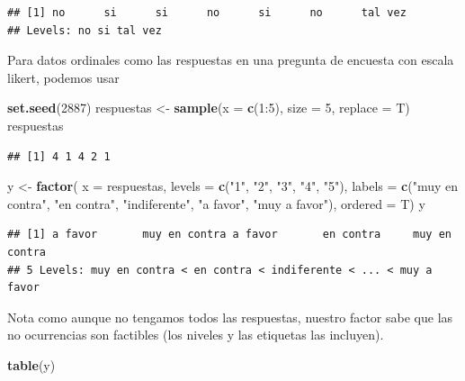 \documentclass[]{article}
\newenvironment{Shaded}{\begin{snugshade}}{\end{snugshade}}
\newcommand{\KeywordTok}[1]{\textcolor[rgb]{0.13,0.29,0.53}{\textbf{{#1}}}}
\newcommand{\DataTypeTok}[1]{\textcolor[rgb]{0.13,0.29,0.53}{{#1}}}
\newcommand{\DecValTok}[1]{\textcolor[rgb]{0.00,0.00,0.81}{{#1}}}
\newcommand{\StringTok}[1]{\textcolor[rgb]{0.31,0.60,0.02}{{#1}}}
\newcommand{\NormalTok}[1]{{#1}}
\begin{document}
\begin{verbatim}
## [1] no      si      si      no      si      no      tal vez
## Levels: no si tal vez
\end{verbatim}

Para datos ordinales como las respuestas en una pregunta de encuesta con
escala likert, podemos usar

\begin{Shaded}
\begin{Highlighting}[]
\KeywordTok{set.seed}\NormalTok{(}\DecValTok{2887}\NormalTok{)}
\NormalTok{respuestas <-}\StringTok{ }\KeywordTok{sample}\NormalTok{(}\DataTypeTok{x =} \KeywordTok{c}\NormalTok{(}\DecValTok{1}\NormalTok{:}\DecValTok{5}\NormalTok{), }\DataTypeTok{size =} \DecValTok{5}\NormalTok{, }\DataTypeTok{replace =}  \NormalTok{T)}
\NormalTok{respuestas }
\end{Highlighting}
\end{Shaded}

\begin{verbatim}
## [1] 4 1 4 2 1
\end{verbatim}

\begin{Shaded}
\begin{Highlighting}[]
\NormalTok{y <-}\StringTok{ }\KeywordTok{factor}\NormalTok{(}
  \DataTypeTok{x =} \NormalTok{respuestas,}
  \DataTypeTok{levels =} \KeywordTok{c}\NormalTok{(}\StringTok{"1"}\NormalTok{, }\StringTok{"2"}\NormalTok{, }\StringTok{"3"}\NormalTok{, }\StringTok{"4"}\NormalTok{, }\StringTok{"5"}\NormalTok{),}
  \DataTypeTok{labels =} \KeywordTok{c}\NormalTok{(}\StringTok{"muy en contra"}\NormalTok{, }\StringTok{"en contra"}\NormalTok{, }\StringTok{"indiferente"}\NormalTok{, }\StringTok{"a favor"}\NormalTok{, }\StringTok{"muy a favor"}\NormalTok{),}
  \DataTypeTok{ordered =} \NormalTok{T)}
\NormalTok{y}
\end{Highlighting}
\end{Shaded}

\begin{verbatim}
## [1] a favor       muy en contra a favor       en contra     muy en contra
## 5 Levels: muy en contra < en contra < indiferente < ... < muy a favor
\end{verbatim}

Nota como aunque no tengamos todos las respuestas, nuestro factor sabe
que las no ocurrencias son factibles (los niveles y las etiquetas las
incluyen).

\begin{Shaded}
\begin{Highlighting}[]
\KeywordTok{table}\NormalTok{(y)}
\end{Highlighting}
\end{Shaded}
\end{document}
